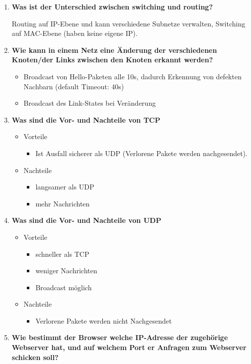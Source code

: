 \documentclass{article}
\begin{document}
\begin{enumerate}
	\item \textbf{Was ist der Unterschied zwischen switching und routing?}
	\begin{flushleft}
		Routing auf IP-Ebene und kann verschiedene Subnetze verwalten, Switching auf MAC-Ebene (haben keine eigene IP).
	\end{flushleft}
	\item \textbf{Wie kann in einem Netz eine Änderung der verschiedenen Knoten/der Links zwischen den Knoten erkannt werden?}
	\begin{itemize}
		\item Broadcast von Hello-Paketen alle 10s, dadurch Erkennung von defekten Nachbarn (default Timeout: 40s)
		\item Broadcast des Link-States bei Veränderung
	\end{itemize}
	\item \textbf{Was sind die Vor- und Nachteile von TCP}
	\begin{itemize}
		\item Vorteile
			\begin{itemize}
				\item Ist Ausfall sicherer als UDP (Verlorene Pakete werden nachgesendet).
			\end{itemize}
		\item Nachteile
			\begin{itemize}
				\item langsamer als UDP 
				\item mehr Nachrichten
			\end{itemize}
	\end{itemize}
	\item \textbf{Was sind die Vor- und Nachteile von UDP}
	\begin{itemize}
		\item Vorteile
		\begin{itemize}
			\item schneller als TCP
			\item weniger Nachrichten
			\item Broadcast möglich
		\end{itemize}
		\item Nachteile
		\begin{itemize}
			\item Verlorene Pakete werden nicht Nachgesendet
		\end{itemize}
	\end{itemize}
	\item \textbf{Wie bestimmt der Browser welche IP-Adresse der zugehörige Webserver hat, und auf welchem Port er Anfragen zum Webserver schicken soll?}

\end{enumerate}
\end{document}
